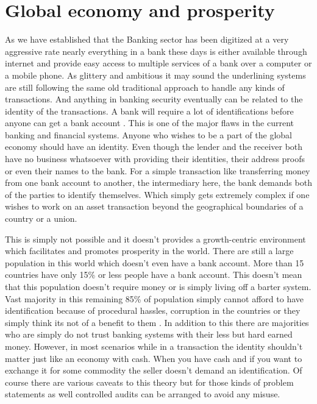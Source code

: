 \section{Global economy and prosperity}
As we have established that the Banking sector has been digitized at a very aggressive rate nearly everything in a bank these days is either available through internet and provide easy access to multiple services of a bank over a computer or a mobile phone. As glittery and ambitious it may sound the underlining systems are still following the same old traditional approach to handle any kinds of transactions. And anything in banking security eventually can be related to the identity of the transactions. A bank will require a lot of identifications before anyone can get a bank account \cite{cocco14}. This is one of the major flaws in the current banking and financial systems. Anyone who wishes to be a part of the global economy should have an identity. Even though the lender and the receiver both have no business whatsoever with providing their identities, their address proofs or even their names to the bank. For a simple transaction like transferring money from one bank account to another, the intermediary here, the bank demands both of the parties to identify themselves. Which simply gets extremely complex if one wishes to work on an asset transaction beyond the geographical boundaries of a country or a union.

This is simply not possible and it doesn't provides a growth-centric environment which facilitates and promotes prosperity in the world. There are still a large population in this world which doesn't even have a bank account. More than 15 countries have only 15\% or less people have a bank account. This doesn't mean that this population doesn't require money or is simply living off a barter system. Vast majority in this remaining 85\% of population simply cannot afford to have identification because of procedural hassles, corruption in the countries or they simply think its not of a benefit to them \cite{camilla15}. In addition to this there are majorities who are simply do not trust banking systems with their less but hard earned money. However, in most scenarios while in a transaction the identity shouldn't matter just like an economy with cash. When you have cash and if you want to exchange it for some commodity the seller doesn't demand an identification. Of course there are various caveats to this theory but for those kinds of problem statements as well controlled audits can be arranged to avoid any misuse.

